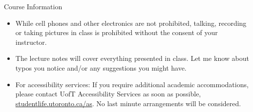 \documentclass[11pt,handout,aspectratio=169]{beamer}
\begin{document}
\begin{frame}{Course Information}
  \begin{itemize}
  \item While cell phones and other electronics are not prohibited, talking, recording or taking pictures in class is prohibited without the consent of your instructor.
  \item The lecture notes will cover everything presented in class. Let me know about typos you notice and/or any suggestions you might have.
  \item For accessibility services: If you require additional academic accommodations, please contact UofT Accessibility Services as soon as possible, \url{studentlife.utoronto.ca/as}. No last minute arrangements will be considered.   
  \end{itemize}
\end{frame}




%
%

\end{document}
